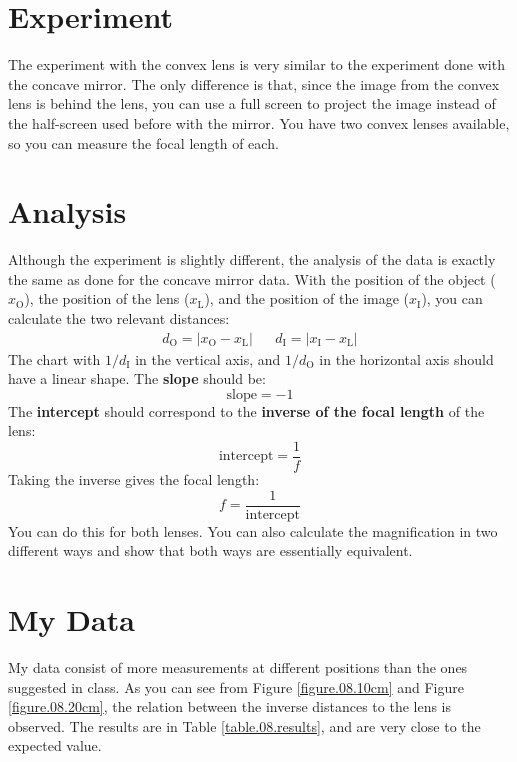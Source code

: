 \section{Experiment}
%
The experiment with the convex lens is very similar to the experiment done with the concave mirror. The only difference is that, since the image from the convex lens is behind the lens, you can use a full screen to project the image instead of the half-screen used before with the mirror. You have two convex lenses available, so you can measure the focal length of each.
%
\section{Analysis}
%
Although the experiment is slightly different, the analysis of the data is exactly the same as done for the concave mirror data. With the position of the object ($x_{\text{O}}$), the position of the lens ($x_{\text{L}}$), and the position of the image ($x_{\text{I}}$), you can calculate the two relevant distances:
\begin{align}
    d_{\text{O}} = \left\vert x_{\text{O}} - x_{\text{L}} \right\vert && d_{\text{I}} = \left\vert x_{\text{I}} - x_{\text{L}} \right\vert
\end{align}
The chart with $1/d_{\text{I}}$ in the vertical axis, and $1/d_{\text{O}}$ in the horizontal axis should have a linear shape. The \textbf{slope} should be:
\begin{equation}
    \text{slope} = -1
\end{equation}
The \textbf{intercept} should correspond to the \textbf{inverse of the focal length} of the lens:
\begin{equation}
    \text{intercept} = \frac{1}{f}
\end{equation}
Taking the inverse gives the focal length:
\begin{equation}
    f = \frac{1}{\text{intercept}}
\end{equation}
You can do this for both lenses. You can also calculate the magnification in two different ways and show that both ways are essentially equivalent.
%
\section{My Data}
%
My data consist of more measurements at different positions than the ones suggested in class. As you can see from Figure \ref{figure.08.10cm} and Figure \ref{figure.08.20cm}, the relation between the inverse distances to the lens is observed. The results are in Table \ref{table.08.results}, and are very close to the expected value.

